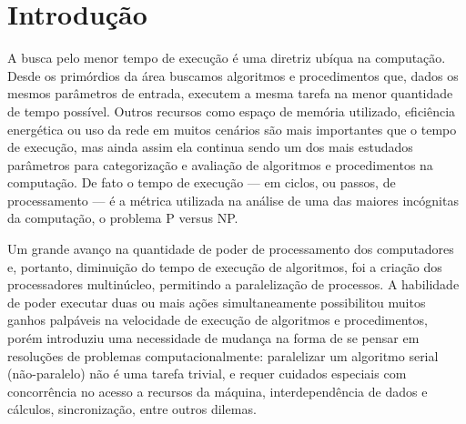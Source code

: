 \documentclass[12pt,
openright, 
oneside, %
a4paper,    %
brazil]{facom-ufu-abntex2}
\begin{document}

\tableofcontents*
\cleardoublepage






\textual





\chapter{Introdução}

A busca pelo menor tempo de execução é uma diretriz ubíqua na computação. Desde os primórdios da área buscamos algoritmos e procedimentos que, dados os mesmos parâmetros de entrada, executem a mesma tarefa na menor quantidade de tempo possível. Outros recursos como espaço de memória utilizado, eficiência energética ou uso da rede em muitos cenários são mais importantes que o tempo de execução, mas ainda assim ela continua sendo um dos mais estudados parâmetros para categorização e avaliação de algoritmos e procedimentos na computação. De fato o tempo de execução --- em ciclos, ou passos, de processamento --- é a métrica utilizada na análise de uma das maiores incógnitas da computação, o problema P versus NP.


Um grande avanço na quantidade de poder de processamento dos computadores e, portanto, diminuição do tempo de execução de algoritmos, foi a criação dos processadores multinúcleo, permitindo a paralelização de processos. A habilidade de poder executar duas ou mais ações simultaneamente possibilitou muitos ganhos palpáveis na velocidade de execução de algoritmos e procedimentos, porém introduziu uma necessidade de mudança na forma de se pensar em resoluções de problemas computacionalmente: paralelizar um algoritmo serial (não-paralelo) não é uma tarefa trivial, e requer cuidados especiais com concorrência no acesso a recursos da máquina, interdependência de dados e cálculos, sincronização, entre outros dilemas.
\end{document}
